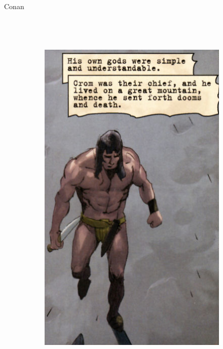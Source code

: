 \begin{frame}{Conan}
\begin{columns}
\begin{figure}[htp]
\begin{subfigure}[b]{0.3\textwidth}
 \end{subfigure}
~
 \begin{subfigure}[b]{0.27\textwidth}
   \includegraphics[width=\textwidth]{img/conan/DH}
 \end{subfigure}
~
 \begin{subfigure}[b]{0.23\textwidth}

\end{subfigure}
\end{figure}
\end{columns}
\end{frame}
